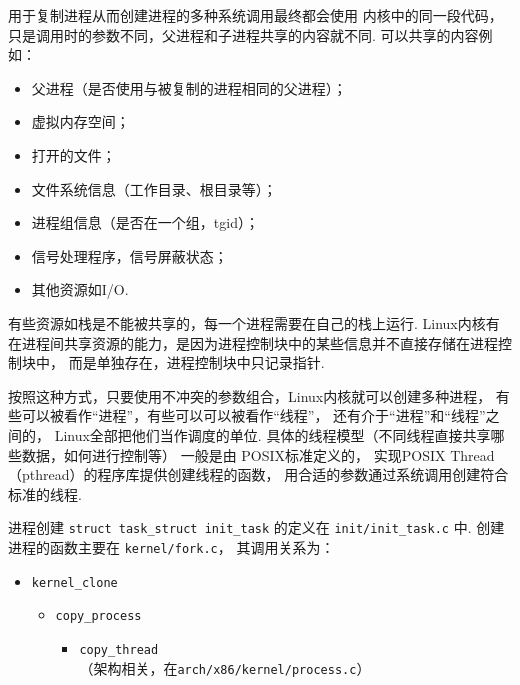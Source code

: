 用于复制进程从而创建进程的多种系统调用最终都会使用 内核中的同一段代码，
只是调用时的参数不同，父进程和子进程共享的内容就不同.
可以共享的内容例如：
\begin{itemize}
	\item 父进程（是否使用与被复制的进程相同的父进程）；
	\item 虚拟内存空间；
	\item 打开的文件；
	\item 文件系统信息（工作目录、根目录等）；
	\item 进程组信息（是否在一个组，tgid）；
	\item 信号处理程序，信号屏蔽状态；
	\item 其他资源如I/O.
\end{itemize}
有些资源如栈是不能被共享的，每一个进程需要在自己的栈上运行.
Linux内核有在进程间共享资源的能力，是因为进程控制块中的某些信息并不直接存储在进程控制块中，
而是单独存在，进程控制块中只记录指针.\cite{silberschatz2021operating}

按照这种方式，只要使用不冲突的参数组合，Linux内核就可以创建多种进程，
有些可以被看作“进程”，有些可以可以被看作“线程”，
还有介于“进程”和“线程”之间的，
Linux全部把他们当作调度的单位.
具体的线程模型（不同线程直接共享哪些数据，如何进行控制等）
一般是由 POSIX标准\cite{pthread}定义的，
实现POSIX Thread （pthread）的程序库提供创建线程的函数，
用合适的参数通过系统调用创建符合标准的线程.

\begin{readsrcbox}{进程创建}
	\lstinline{struct task_struct init_task} 的定义在 \lstinline{init/init_task.c}
	中.
	创建进程的函数主要在 \lstinline{kernel/fork.c}，
	其调用关系为：
	\begin{itemize}
		\item \lstinline{kernel_clone}
		      \begin{itemize}
			      \item \lstinline{copy_process}
			            \begin{itemize}
				            \item \lstinline{copy_thread} \\
				                  （架构相关，在\lstinline{arch/x86/kernel/process.c}）
			            \end{itemize}
		      \end{itemize}
	\end{itemize}
\end{readsrcbox}
